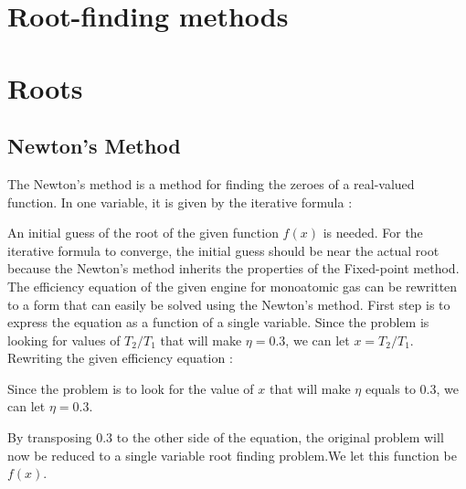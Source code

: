 \documentclass[a4paper]{article}
\begin{document}
	\section{Root-finding methods}
	
	\section{Roots}
		\subsection{Newton's Method}
			The Newton's method is a method for finding the zeroes of a real-valued function. In one variable, it is given by the iterative formula :  \\
\begin{center}
\end{center}

An initial guess of the root of the given function $f(x)$ is needed. For the iterative formula to converge, the initial guess should  be near the actual root because the Newton's method inherits the properties of the Fixed-point method. \\

The efficiency equation of the given engine for monoatomic gas can be rewritten to a form that can easily be solved using the Newton's method. First step is to express the equation as a function of a single variable. Since the problem is looking for values of $T_{2}/T_{1}$ that will make $\eta = 0.3$,  we can let $x = T_{2}/T_{1}$.  Rewriting the given efficiency equation :

\begin{center}
\end{center}
 
Since the problem is to look for the value of $x$ that will make $\eta$ equals to 0.3, we can let $\eta = 0.3$.

\begin{center}
\end{center}

By transposing 0.3 to the other side of the equation, the original problem will now be reduced to a single variable root finding problem.We let this function be $f(x)$. 
\end{document}
